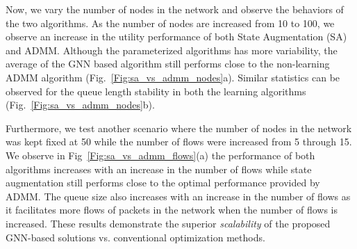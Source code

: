\documentclass[lettersize,journal]{IEEEtran}
\begin{document}
Now, we vary the number of nodes in the network and observe the behaviors of the two algorithms. As the number of nodes are increased from 10 to 100, we observe an increase in the utility performance of both State Augmentation (SA) and ADMM. Although the parameterized algorithms has more variability, the average of the GNN based algorithm still performs close to the non-learning ADMM algorithm (Fig.~\ref{Fig:sa_vs_admm_nodes}a). Similar statistics can be observed for the queue length stability in both the learning algorithms (Fig.~\ref{Fig:sa_vs_admm_nodes}b). 
\begin{figure*}%
    \centering   
    \hfill
    \caption{Performance of state augmentation and ADMM algorithms for network with 50 nodes and $K\in\{5, 10, 15\}$ flows.}
    \label{Fig:sa_vs_admm_flows}
\end{figure*}
Furthermore, we test another scenario where the number of nodes in the network was kept fixed at 50 while the number of flows were increased from 5 through 15. We observe in Fig~\ref{Fig:sa_vs_admm_flows}(a) the performance of both algorithms increases with an increase in the number of flows while state augmentation still performs close to the optimal performance provided by ADMM. The queue size also increases with an increase in the number of flows as it facilitates more flows of packets in the network when the number of flows is increased. These results demonstrate the superior \emph{scalability} of the proposed GNN-based solutions vs. conventional optimization methods.
\end{document}
